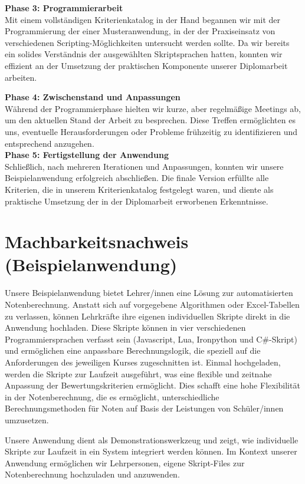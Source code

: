 \textbf{Phase 3: Programmierarbeit}\\
Mit einem vollständigen Kriterienkatalog in der Hand begannen wir mit der 
Programmierung der einer Musteranwendung, in der der Praxiseinsatz von verschiedenen 
Scripting-Möglichkeiten untersucht werden sollte. Da wir bereits ein solides Verständnis 
der ausgewählten Skriptsprachen hatten, konnten wir effizient an der Umsetzung der praktischen 
Komponente unserer Diplomarbeit arbeiten.

\newpage

\textbf{Phase 4: Zwischenstand und Anpassungen}\\
Während der Programmierphase hielten wir kurze, aber regelmäßige Meetings ab, 
um den aktuellen Stand der Arbeit zu besprechen. Diese Treffen ermöglichten es uns, 
eventuelle Herausforderungen oder Probleme frühzeitig zu identifizieren und 
entsprechend anzugehen.\\

\textbf{Phase 5: Fertigstellung der Anwendung}\\
Schließlich, nach mehreren Iterationen und Anpassungen, konnten wir unsere Beispielanwendung 
erfolgreich abschließen. Die finale Version erfüllte alle Kriterien, die in 
unserem Kriterienkatalog festgelegt waren, und diente als praktische Umsetzung 
der in der Diplomarbeit erworbenen Erkenntnisse.


\newpage
\section{Machbarkeitsnachweis (Beispielanwendung)}

Unsere Beispielanwendung bietet Lehrer/innen eine Lösung zur automatisierten Notenberechnung. 
Anstatt sich auf vorgegebene Algorithmen oder Excel-Tabellen zu verlassen, 
können Lehrkräfte ihre eigenen individuellen Skripte direkt in die Anwendung hochladen. 
Diese Skripte können in vier verschiedenen Programmiersprachen verfasst sein 
(Javascript, Lua, Ironpython und C\#-Skript) und ermöglichen eine anpassbare Berechnungslogik, 
die speziell auf die Anforderungen des jeweiligen Kurses zugeschnitten ist. Einmal hochgeladen, 
werden die Skripte zur Laufzeit ausgeführt, was eine flexible und zeitnahe Anpassung der 
Bewertungskriterien ermöglicht. Dies schafft eine hohe Flexibilität in der Notenberechnung, 
die es ermöglicht, unterschiedliche Berechnungsmethoden für Noten auf Basis der Leistungen von
Schüler/innen umzusetzen.

Unsere Anwendung dient als Demonstrationswerkzeug und zeigt, wie individuelle Skripte zur 
Laufzeit in ein System integriert werden können. Im Kontext unserer Anwendung ermöglichen wir 
Lehrpersonen, eigene Skript-Files zur Notenberechnung hochzuladen und anzuwenden.

